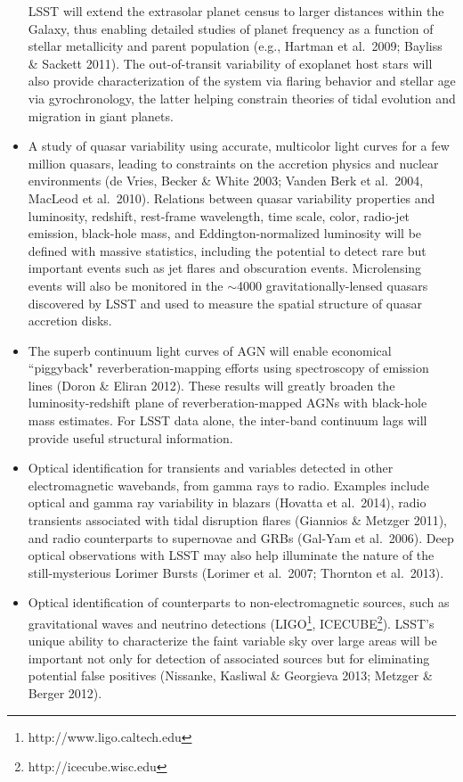 \documentclass{emulateapj}
\begin{document}
\begin{itemize}
LSST will extend the extrasolar planet census to larger distances within the Galaxy, thus enabling detailed studies 
of planet frequency as a function of stellar metallicity and parent population (e.g., Hartman et al.~2009; Bayliss \& 
Sackett 2011). The out-of-transit variability of exoplanet host stars will also provide characterization of the system 
via flaring behavior and stellar age via gyrochronology, the latter helping constrain theories of tidal evolution and 
migration in giant planets. 
\item A study of quasar variability using accurate, multicolor light
  curves for a few million  
quasars, leading to constraints on the accretion physics and nuclear environments (de Vries, Becker 
\& White 2003; Vanden Berk et al.~2004, MacLeod et al.~2010). Relations between quasar variability 
      properties and luminosity, redshift, 
      rest-frame wavelength, time scale, color, radio-jet emission, black-hole 
      mass, and Eddington-normalized luminosity will be defined with massive
      statistics, including the potential to detect rare but important events such as 
      jet flares and obscuration events. Microlensing events will also be monitored in the $\sim$4000 gravitationally-lensed 
      quasars discovered by LSST and used to measure the spatial structure of quasar accretion disks.
\item The superb continuum light curves of AGN will enable economical ``piggyback" 
      reverberation-mapping efforts using spectroscopy of emission lines (Doron \& Eliran 2012). These results 
      will greatly broaden the luminosity-redshift plane of reverberation-mapped AGNs
      with black-hole mass estimates. For LSST data alone, the inter-band continuum lags 
      will provide useful structural information. 
\item Optical identification for transients and variables detected in other electromagnetic wavebands, 
from gamma rays to radio. Examples include optical and gamma ray variability in blazars (Hovatta et al.~2014), 
radio transients associated with tidal disruption flares (Giannios \& Metzger 2011), and radio counterparts to 
supernovae and GRBs (Gal-Yam et al.~2006). Deep optical observations with LSST may also help illuminate the 
nature of the still-mysterious Lorimer Bursts (Lorimer et al.~2007; Thornton et al.~2013).
\item Optical identification of counterparts to non-electromagnetic sources, such as gravitational waves and
neutrino detections (LIGO\footnote{http://www.ligo.caltech.edu}, ICECUBE\footnote{http://icecube.wisc.edu}). 
LSST's unique ability to characterize the faint variable sky over large areas will be important not only for detection 
of associated sources but for eliminating potential false positives (Nissanke, Kasliwal \& Georgieva 2013; 
Metzger \& Berger 2012).  
\end{itemize}
\end{document}
